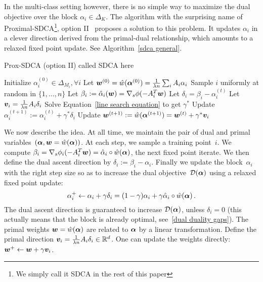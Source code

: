 In the multi-class setting however, there is no simple way to maximize the dual objective over the block $\alpha_i \in \Delta_K$.
The algorithm with the surprising name of Proximal-SDCA\footnote{We simply call it SDCA in the rest of this paper}, option II~\citep{shalev2016accelerated} proposes a solution to this problem.
It updates $\alpha_i$  in a clever direction derived from the primal-dual relationship, which amounts to a relaxed fixed point update. See Algorithm~\ref{sdca general}.

\begin{algorithm}[t]
    \caption{Prox-SDCA (option II) called SDCA here}%
    \label{sdca general}
	\begin{algorithmic}
        \STATE Initialize $\alpha_i^{(0)} \in \Delta_{M_i}, \forall i$
        \STATE Let $\boldsymbol{w}^{(0)} = \hat{w}(\bm{\alpha}^{(0)}) = \frac{1}{\lambda n} \sum_i A_i \alpha_i$
                \STATE Sample $i$ uniformly at random in $\{1,\ldots,n\}$
                \STATE Let $ \beta_i := \hat{\alpha}_i(\boldsymbol{w}) = \nabla_s \phi(-A_i^T \boldsymbol{w})$
                \STATE Let $\delta_i = \beta_i - \alpha_i^{(t)}$ 
                \STATE Let $\bm v_i = \frac{1}{\lambda n} A_i \delta_i $ 
                \STATE Solve Equation~\eqref{line search equation} to get $\gamma^*$ 
               \STATE Update $\alpha_i^{(t+1)} := \alpha_i^{(t)} + \gamma^* \delta_i$
               \STATE Update $\boldsymbol{w}^{(t+1)} := \hat{w}(\bm{\alpha}^{(t+1)}) = \boldsymbol{w}^{(t)} + \gamma^* \bm v_i $
        \ENDFOR
	\end{algorithmic}
\end{algorithm}


We now describe the idea.
At all time, we maintain the pair of dual and primal variables~$(\boldsymbol{\alpha}, \boldsymbol{w} = \hat w (\boldsymbol{\alpha}))$.
At each step, we sample a training point~$i$.
We compute $\beta_i = \nabla_s \phi_i(-A_i^T \boldsymbol{w}) = \hat \alpha_i \circ \hat w(\boldsymbol{\alpha})$,  the next fixed point iterate.
We then define the dual ascent direction by $\delta_i := \beta_i - \alpha_i$.
Finally we update the block~$\alpha_i$ with the right step size so as to increase the dual objective~${\mathcal D}(\boldsymbol{\alpha})$ using a relaxed fixed point update:
\begin{equation} \label{eq:dual_fixed_pt_update}
	\alpha_i^+ \leftarrow \alpha_i + \gamma \delta_i = (1-\gamma)\alpha_i + \gamma \hat \alpha_i \circ \hat w(\boldsymbol{\alpha}) \, .
\end{equation}
The dual ascent direction is guaranteed to increase ${\mathcal D}(\boldsymbol{\alpha})$, unless $\delta_i = 0$ (this actually means that the block is already optimal, see~\eqref{dual duality gaps}).
The primal weights $\boldsymbol{w} = \hat w (\boldsymbol{\alpha})$ are related to $\boldsymbol{\alpha}$ by a linear transformation.
Define the primal direction $\bm v_i = \frac{1}{\lambda n} A_i \delta_i \in \mathbb{R}^d$.
One can update the weights directly: $\boldsymbol{w}^+ \leftarrow \boldsymbol{w} + \gamma \bm v_i$.

